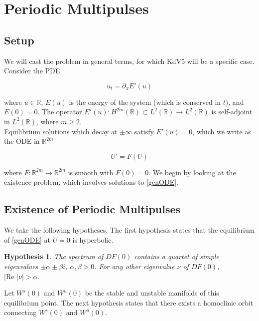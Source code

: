 \documentclass[12pt]{article}
\def\R{{\mathbb R}}
\newtheorem{hypothesis}{Hypothesis}
\begin{document}
\section{Periodic Multipulses}

\subsection{Setup}

We will cast the problem in general terms, for which KdV5 will be a specific case. Consider the PDE

\begin{equation}\label{genPDE}
u_t = \partial_x E'(u)
\end{equation}

where $u \in \R$, $E(u)$ is the energy of the system (which is conserved in $t$), and $E(0) = 0$. The operator $E'(u): H^{2m}(\R) \subset L^2(\R) \rightarrow L^2(\R)$ is self-adjoint in $L^2(\R)$, where $m \geq 2$.\\

Equilibrium solutions which decay at $\pm \infty$ satisfy $E'(u) = 0$, which we write as the ODE in $\R^{2m}$

\begin{equation}\label{genODE}
U' = F(U)
\end{equation}

where $F: \R^{2m} \rightarrow \R^{2m}$ is smooth with $F(0) = 0$. We begin by looking at the existence problem, which involves solutions to \eqref{genODE}.

\subsection{Existence of Periodic Multipulses}

We take the following hypotheses. The first hypothesis states that the equilibrium of \eqref{genODE} at $U = 0$ is hyperbolic. 

\begin{hypothesis}\label{hypeq}
The spectrum of $DF(0)$ contains a quartet of simple eigenvalues $\pm \alpha \pm \beta i$, $\alpha, \beta > 0$. For any other eigenvalue $\nu$ of $DF(0)$, $|\text{Re }|\nu| > \alpha$.
\end{hypothesis}

Let $W^s(0)$ and $W^u(0)$ be the stable and unstable manifolds of this equilibrium point. The next hypothesis states that there exists a homoclinic orbit connecting $W^s(0)$ and $W^u(0)$.
\end{document}
